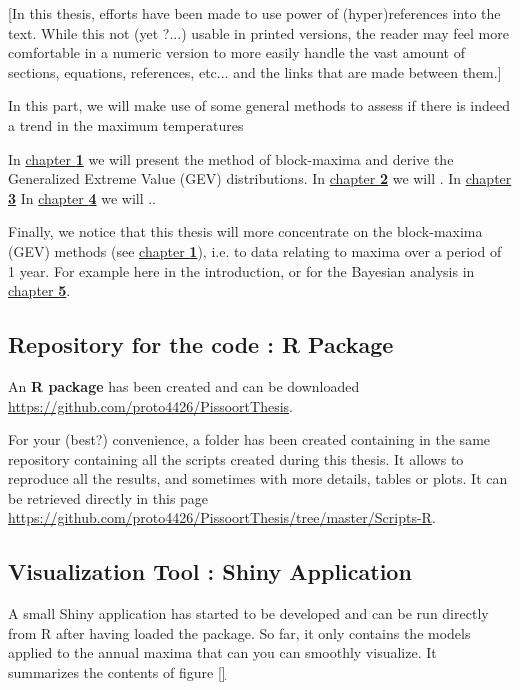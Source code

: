 \documentclass[11pt,a4paper,openany ]{book}
\begin{document}
[In this thesis, efforts have been made to use power of (hyper)references into the 
text. While this not (yet ?...) usable in printed versions, the reader may feel more 
comfortable in a numeric version to more easily handle the vast amount of sections, 
equations, references, etc... and the links that are made between them.]

In this part, we will make use of some general methods to assess if there is indeed a trend in the maximum temperatures

In \hyperref[sec::1]{chapter \textbf{1}} we will present the method of block-maxima and derive the Generalized Extreme Value (GEV) distributions. In \hyperref[sec::2]{chapter \textbf{2}} we will .
In \hyperref[sec::3]{chapter \textbf{3}}
In \hyperref[sec::4]{chapter \textbf{4}} we will ..

Finally, we notice that this thesis will more concentrate on the block-maxima (GEV) methods (see \hyperref[sec::1]{chapter \textbf{1}}), i.e. to data relating to maxima over a period of 1 year. For example here in the introduction, or for the Bayesian analysis in \hyperref[sec::bayesian]{chapter \textbf{5}}.
\thispagestyle{empty}

\subsection*{Repository for the code : R Package}

An \textbf{R package} has been created and can be downloaded \url{https://github.com/proto4426/PissoortThesis}.

For your (best?) convenience, a folder has been created containing in the same repository containing all the scripts created during this thesis. It allows to reproduce all the results, and sometimes with more details, tables or plots. It can be retrieved directly in this page \url{https://github.com/proto4426/PissoortThesis/tree/master/Scripts-R}.

\subsection*{Visualization Tool : Shiny Application}

A small Shiny application has started to be developed and can be run directly from R after having loaded the package. So far, it only contains the models applied to the annual maxima that can you can smoothly visualize. It summarizes the contents of figure \ref{}
\end{document}
